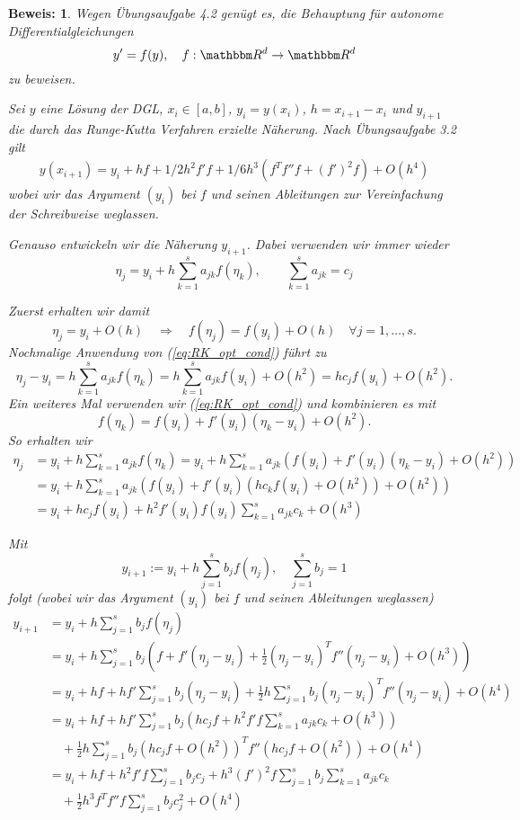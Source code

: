 \documentclass[12pt,a4paper]{book}
\theoremstyle{break}
\theoremstyle{nonumberplain}
\newtheorem{beweis}{Beweis:}
\newcommand{\R}{\mathbbm R}
\newcommand{\1}{\mathbbm{1}} 			      	%
\newcommand{\labeq}[1]{\label{eq:#1}}			%
\newcommand{\req}[1]{(\ref{eq:#1})}
\begin{document}
\begin{beweis}
Wegen Übungsaufgabe 4.2 genügt es, die Behauptung für \emph{autonome} Differentialgleichungen
\[
y'=f(y), \quad f:\R^d \to \R^d
\]
zu beweisen.

Sei $y$ eine Lösung der DGL, $x_i\in [a,b]$, $y_i=y(x_i)$, $h=x_{i+1}-x_i$ und $y_{i+1}$ die durch das Runge-Kutta Verfahren 
erzielte Näherung. Nach Übungsaufgabe 3.2 gilt
\begin{align*}
y(x_{i+1})=y_i+h f+1/2 h^2 f' f + 1/6 h^3 ( f^T f'' f + (f')^2 f ) + O(h^4)
\end{align*}
wobei wir das Argument $(y_i)$ bei $f$ und seinen Ableitungen zur Vereinfachung der Schreibweise weglassen.

Genauso entwickeln wir die Näherung $y_{i+1}$. Dabei verwenden wir immer wieder
\begin{equation}\labeq{RK_opt_cond}
\eta_j = y_i + h \sum_{k=1}^s a_{jk} f(\eta_k), \qquad  \sum_{k=1}^s a_{jk}=c_j 
\end{equation}

Zuerst erhalten wir damit
\[
\eta_j=y_i + O(h) \quad \Longrightarrow \quad f(\eta_j)=f(y_i) + O(h) \quad \forall j=1,\ldots,s.
\]
Nochmalige Anwendung von \req{RK_opt_cond} führt zu
\[
\eta_j - y_i = h \sum_{k=1}^s a_{jk} f(\eta_k) = h \sum_{k=1}^s a_{jk} f(y_i) + O(h^2)= h c_j f(y_i) + O(h^2).
\]
Ein weiteres Mal verwenden wir \req{RK_opt_cond} und kombinieren es mit
\[
f(\eta_k)=f(y_i)+f'(y_i)(\eta_k-y_i) + O(h^2).
\]
So erhalten wir 
\begin{align*}
\eta_j &=  y_i + h \sum_{k=1}^s a_{jk} f(\eta_k) 
= y_i + h \sum_{k=1}^s a_{jk} (f(y_i) + f'(y_i) (\eta_k-y_i) + O(h^2))\\
&= y_i + h \sum_{k=1}^s a_{jk} (f(y_i) + f'(y_i) \left(h c_k f(y_i) + O(h^2) \right) + O(h^2))\\
&= y_i + h c_j f(y_i)
+ h^2 f'(y_i) f(y_i) \sum_{k=1}^s a_{jk} c_k  
+ O(h^3)
\end{align*}

Mit 
\[
y_{i+1}:=y_i +  h \sum_{j=1}^s b_j f(\eta_j), \quad \sum_{j=1}^s b_j=1
\]
folgt (wobei wir das Argument $(y_i)$ bei $f$ und seinen Ableitungen weglassen)
\begin{align*}
y_{i+1} &= y_i +  h \sum_{j=1}^s b_j f(\eta_j)\\
&=  y_i + h  \sum_{j=1}^s b_j \left( f + f' (\eta_j-y_i) + \frac{1}{2} (\eta_j-y_i)^T f'' (\eta_j-y_i)  + O(h^3) \right)\\
&= y_i + h f + h f'  \sum_{j=1}^s b_j  (\eta_j-y_i) + \frac{1}{2} h \sum_{j=1}^s b_j (\eta_j-y_i)^T f'' (\eta_j-y_i) + O(h^4)\\
&= y_i + h f + h f'  \sum_{j=1}^s b_j  \left( h c_j f + h^2 f' f \sum_{k=1}^s a_{jk} c_k + O(h^3)\right)\\
& \quad {}   + \frac{1}{2} h \sum_{j=1}^s b_j \left( h c_j f + O(h^2)\right)^T f'' \left( h c_j f + O(h^2) \right) + O(h^4)\\
&= y_i + h f + h^2 f' f  \sum_{j=1}^s b_j  c_j + h^3 (f')^2 f \sum_{j=1}^s b_j \sum_{k=1}^s a_{jk} c_k\\
& \quad {} + \frac{1}{2} h^3 f^T f'' f \sum_{j=1}^s b_j c_j^2 + O(h^4)
\end{align*}


\end{beweis}
\end{document}
